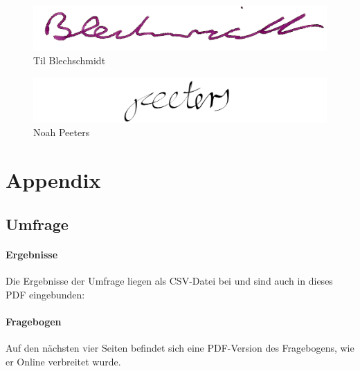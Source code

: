 \documentclass[a4paper]{article}
\begin{document}
        
        \begin{figure}[H]
            \centering
            \begin{minipage}{.5\textwidth}
                \centering
                \includegraphics[width=\textwidth]{assets/signature_tilb.png}
                Til Blechschmidt
                \label{fig:test1}
            \end{minipage}%
            \begin{minipage}{.5\textwidth}
                \centering
                \includegraphics[width=\textwidth]{assets/signature_noahp.png}
                Noah Peeters
                \label{fig:test2}
            \end{minipage}
        \end{figure}
        \clearpage
    
    \clearpage
    \section{Appendix}
        \printglossary[type=\acronymtype]
        \printglossary
        
        \clearpage
        \printbibliography
        
        \clearpage
        
        \subsection{Umfrage}
            \paragraph{Ergebnisse}
                Die Ergebnisse der Umfrage liegen als CSV-Datei bei und sind auch in dieses PDF eingebunden: 
            \paragraph{Fragebogen}
                Auf den nächsten vier Seiten befindet sich eine PDF-Version des Fragebogens, wie er Online verbreitet wurde.
                
\end{document}

